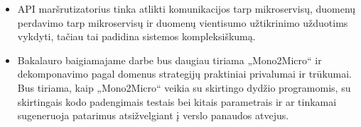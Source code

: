 \documentclass[fleqn]{VUMIFPSkursinis}
\begin{document}
\begin{itemize}
    \item API maršrutizatorius tinka atlikti komunikacijos tarp mikroservisų, duomenų perdavimo tarp mikroservisų ir duomenų vientisumo užtikrinimo užduotims vykdyti, tačiau tai padidina sistemos kompleksiškumą.
    
    \item Bakalauro baigiamajame darbe bus daugiau tiriama „Mono2Micro“ ir dekomponavimo pagal domenus strategijų praktiniai privalumai ir trūkumai. Bus tiriama, kaip „Mono2Micro“ veikia su skirtingo dydžio programomis, su skirtingais kodo padengimais testais bei kitais parametrais ir ar tinkamai sugeneruoja patarimus atsižvelgiant į verslo panaudos atvejus.
\end{itemize}

\printbibliography  %
\end{document}
